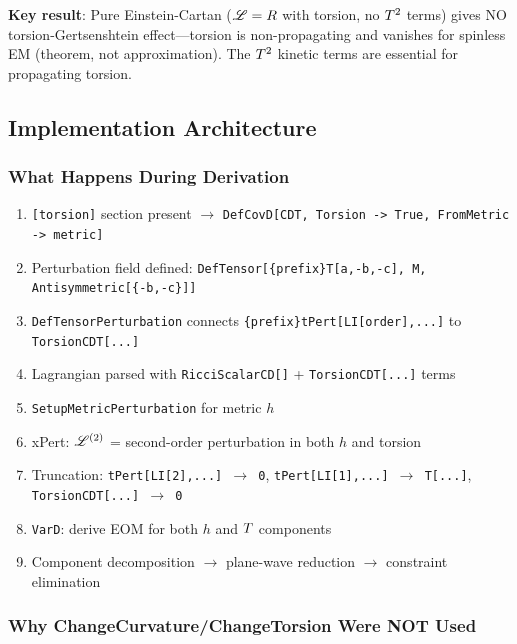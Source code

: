 \textbf{Key result}: Pure Einstein-Cartan ($\mathscr{L} = R$ with torsion, no $T^2$ terms) gives NO torsion-Gertsenshtein effect---torsion is non-propagating and vanishes for spinless EM (theorem, not approximation). The $T^2$ kinetic terms are essential for propagating torsion.

\subsection{Implementation Architecture}
\label{sec:torsion-implementation}

\subsubsection{What Happens During Derivation}
\label{sec:torsion-derivation-steps}

\begin{enumerate}
  \item \texttt{[torsion]} section present $\to$ \texttt{DefCovD[CDT, Torsion -> True, FromMetric -> metric]}
  \item Perturbation field defined: \texttt{DefTensor[\{prefix\}T[a,-b,-c], M, Antisymmetric[\{-b,-c\}]]}
  \item \texttt{DefTensorPerturbation} connects \texttt{\{prefix\}tPert[LI[order],...]} to \texttt{TorsionCDT[...]}
  \item Lagrangian parsed with \texttt{RicciScalarCD[]} + \texttt{TorsionCDT[...]} terms
  \item \texttt{SetupMetricPerturbation} for metric $h$
  \item xPert: $\mathscr{L}^{(2)}$ = second-order perturbation in both $h$ and torsion
  \item Truncation: \texttt{tPert[LI[2],...] $\to$ 0}, \texttt{tPert[LI[1],...] $\to$ T[...]}, \texttt{TorsionCDT[...] $\to$ 0}
  \item \texttt{VarD}: derive EOM for both $h$ and $T$ components
  \item Component decomposition $\to$ plane-wave reduction $\to$ constraint elimination
\end{enumerate}

\subsubsection{Why ChangeCurvature/ChangeTorsion Were NOT Used}
\label{sec:why-not-changecurvature}

